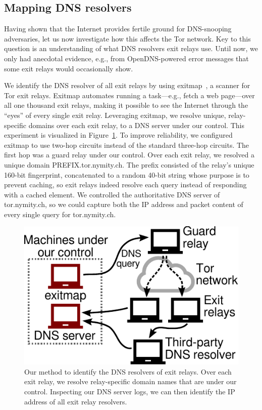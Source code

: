 \subsection{Mapping DNS resolvers}
\label{sec:mapping-resolvers}
Having shown that the Internet provides fertile ground for DNS-snooping
adversaries, let us now investigate how this affects the Tor network.  Key to
this question is an understanding of what DNS resolvers exit relays use.  Until
now, we only had anecdotal evidence, e.g., from OpenDNS-powered error messages
that some exit relays would occasionally show.

We identify the DNS resolver of all exit relays by using
exitmap~\cite{exitmap}, a scanner for Tor exit relays.  Exitmap automates
running a task---e.g., fetch a web page---over all one thousand exit relays,
making it possible to see the Internet through the ``eyes'' of every single
exit relay.  Leveraging exitmap, we resolve unique, relay-specific domains over
each exit relay, to a DNS server under our control.  This experiment is
visualized in Figure~\ref{fig:dnsenum}.  To improve reliability, we configured
exitmap to use two-hop circuits instead of the standard three-hop circuits.
The first hop was a guard relay under our control.  Over each exit relay, we
resolved a unique domain PREFIX.tor.nymity.ch.  The prefix consisted of the
relay's unique 160-bit fingerprint, concatenated to a random 40-bit string
whose purpose is to prevent caching, so exit relays indeed resolve each query
instead of responding with a cached element.  We controlled the authoritative
DNS server of tor.nymity.ch, so we could capture both the IP address and packet
content of every single query for tor.nymity.ch.

\begin{figure}[t]
	\centering
	\includegraphics[width=0.6\linewidth]{figures/resolver-identification.pdf}
	\caption{Our method to identify the DNS resolvers of exit relays.  Over
	each exit relay, we resolve relay-specific domain names that are under our
	control.  Inspecting our DNS server logs, we can then identify the IP
	address of all exit relay resolvers.}
	\label{fig:dnsenum}
\end{figure}

